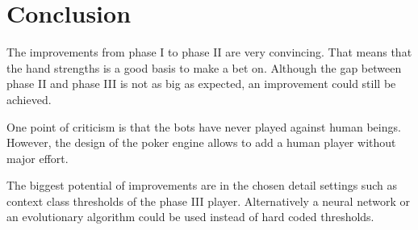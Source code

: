 \chapter{Conclusion}
The improvements from phase I to phase II are very convincing. That means that the hand strengths is a good basis to make a bet on. Although the gap between phase II and phase III is not as big as expected, an improvement could still be achieved.

One point of criticism is that the bots have never played against human beings. However, the design of the poker engine allows to add a human player without major effort.

The biggest potential of improvements are in the chosen detail settings such as context class thresholds of the phase III player. Alternatively a neural network or an evolutionary algorithm could be used instead of hard coded thresholds.
